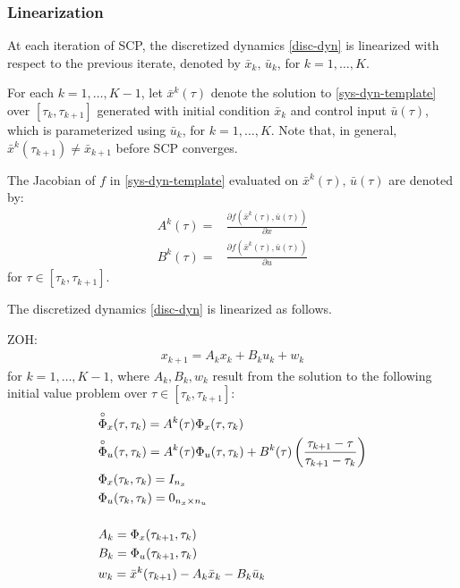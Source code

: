 \documentclass[11pt,a4paper]{article}
\begin{document}
\subsubsection{Linearization}

At each iteration of SCP, the discretized dynamics \eqref{disc-dyn} is linearized with respect to the previous iterate, denoted by $\bar{x}_k,\,\bar{u}_k$, for $k=1,\ldots,K$. 

For each $k=1,\ldots,K-1$, let $\bar{x}^k(\tau)$ denote the solution to \eqref{sys-dyn-template} over $[\tau_k,\tau_{k+1}]$ generated with initial condition $\bar{x}_k$ and control input $\bar{u}(\tau)$, which is parameterized using $\bar{u}_k$, for $k=1,\ldots,K$. Note that, in general, $\bar{x}^k(\tau_{k+1})\ne \bar{x}_{k+1}$ before SCP converges.

The Jacobian of $f$ in \eqref{sys-dyn-template} evaluated on $\bar{x}^k(\tau),\,\bar{u}(\tau)$ are denoted by:
\begin{align*}
    A^k(\tau) ={} & \frac{\partial f(\bar{x}^k(\tau),\bar{u}(\tau))}{\partial x}\\
    B^k(\tau) ={} & \frac{\partial f(\bar{x}^k(\tau),\bar{u}(\tau))}{\partial u}
\end{align*}
for $\tau\in[\tau_k,\tau_{k+1}]$.

The discretized dynamics \eqref{disc-dyn} is linearized as follows.

ZOH:
\begin{align}
    x_{k+1} = A_kx_{k} + B_ku_k + w_k     
\end{align}
for $k=1,\ldots,K-1$, where $A_k,B_k,w_k$ result from the solution to the following initial value problem over $\tau\in[\tau_k,\tau_{k+1}]$:
\begin{align*}
    & \overset{\circ}{\Phi}_x(\tau,\tau_k) = A^k(\tau)\Phi_x(\tau,\tau_k)\\ 
    & \overset{\circ}{\Phi}_u(\tau,\tau_k) = A^k(\tau)\Phi_u(\tau,\tau_k) + B^k(\tau)\left(\frac{\tau_{k+1}-\tau}{\tau_{k+1}-\tau_k}\right)\\
    & \Phi_x(\tau_k,\tau_k) = I_{n_x}\\
    & \Phi_u(\tau_k,\tau_k) = 0_{n_x\times n_u}\\[0.5cm]
    & A_k = \Phi_x(\tau_{k+1},\tau_k)\\
    & B_k = \Phi_u(\tau_{k+1},\tau_k)\\
    & w_k = \bar{x}^k(\tau_{k+1}) - A_k\bar{x}_k - B_k\bar{u}_{k} 
\end{align*}
\end{document}
